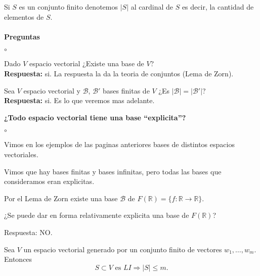 \documentclass{article}
\theoremstyle{definition}
\theoremstyle{definition}
\theoremstyle{remark}
\begin{document}
Si $S$ es un conjunto finito denotemos $|S|$ al cardinal de $S$ es decir, la cantidad de elementos de $S$. \\\\ 
\textbf{Preguntas}
\begin{list}{$\circ$}{}  
\item Dado $V$ espacio vectorial ¿Existe una base de $V$? \\
  \textbf{Respuesta:} si. La respuesta la da la teoria de conjuntos (Lema de Zorn). 
\item Sea $V$ espacio vectorial y $\mathcal{B}$, $\mathcal{B}'$ bases finitas de $V$ ¿Es $|\mathcal{B}|=|\mathcal{B}'|$? \\ \textbf{Respuesta:} si. Es lo que veremos mas adelante.
\end{list}
\begin{center}
\textbf{¿Todo espacio vectorial tiene una base ``explicita''?}
\end{center}
\begin{list}{$\circ$}{}  
\item Vimos en los ejemplos de las paginas anteriores bases de distintos espacios vectoriales. 
\item Vimos que hay bases finitas y bases infinitas, pero todas las bases que consideramos eran explicitas. 
\item Por el Lema de Zorn existe una base $\mathcal{B}$ de $F(\mathbb{R})=\{f: \mathbb{R} \to \mathbb{R}\}$. 
\item ¿Se puede dar en forma relativamente explicita una base de $F(\mathbb{R})$? 
\item Respuesta: NO.
\end{list}
\begin{teo}
  Sea $V$ un espacio vectorial generado por un conjunto finito de vectores $w_1, \dots ,w_m$. Entonces \[
    S \subset V \text{ es }  LI \Rightarrow |S| \leq m.
  \]
\end{teo}
\end{document}
